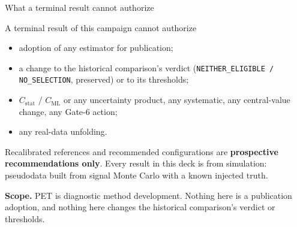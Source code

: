\documentclass[aspectratio=169,10pt]{beamer}
\def\evidencetext{}
\begin{document}
\gdef\evidencetext{\texttt{PROTOCOL-20260922.md \S 1}; \texttt{../configuration\_comparison/campaign\_report.json}}
\begin{frame}{What a terminal result cannot authorize}
\begin{alertblock}{A terminal result of this campaign cannot authorize}
\begin{itemize}
\item adoption of any estimator for publication;
\item a change to the historical comparison's verdict (\texttt{NEITHER\_ELIGIBLE / NO\_SELECTION}, preserved) or to its thresholds;
\item $C_{\mathrm{stat}}$ / $C_{\mathrm{ML}}$ or any uncertainty product, any systematic, any central-value change,
any Gate-6 action;
\item any real-data unfolding.
\end{itemize}
\end{alertblock}
Recalibrated references and recommended configurations are \textbf{prospective recommendations only}.
Every result in this deck is from simulation: pseudodata built from signal Monte Carlo with a known
injected truth.\par\vspace{6pt}
\textbf{Scope.} PET is diagnostic method development. Nothing here is a publication adoption, and nothing here changes the historical comparison's verdict or thresholds.
\end{frame}
\end{document}
